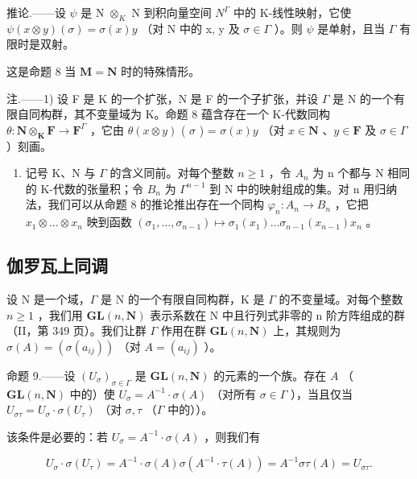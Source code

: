 推论.——设 \(\psi\) 是 N \(\otimes_{K}\) N 到积向量空间 \(N^{\Gamma}\) 中的 K-线性映射，它使 \(\psi(x \otimes y) (\sigma) = \sigma(x)y\) （对 N 中的 x, y 及 \(\sigma \in \Gamma\) ）。则 \(\psi\) 是单射，且当 \(\Gamma\) 有限时是双射。

这是命题 8 当 \(\mathbf{M} = \mathbf{N}\) 时的特殊情形。

注.——1) 设 F 是 K 的一个扩张，N 是 F 的一个子扩张，并设 \(\Gamma\) 是 N 的一个有限自同构群，其不变量域为 K。命题 8 蕴含存在一个 K-代数同构 \(\theta: \mathbf{N} \otimes_{\mathbf{K}} \mathbf{F} \to \mathbf{F}^{\Gamma}\) ，它由 \(\theta(x \otimes y)\) ( \(\sigma\) ) = \(\sigma(x)y\) （对 \(x \in \mathbf{N}\) 、\(y \in \mathbf{F}\) 及 \(\sigma \in \Gamma\) ）刻画。

\begin{enumerate}
\def\labelenumi{\arabic{enumi})}
\setcounter{enumi}{1}
\tightlist
\item
  记号 K、N 与 \(\Gamma\) 的含义同前。对每个整数 \(n \geqslant 1\) ，令 \(A_{n}\) 为 n 个都与 N 相同的 K-代数的张量积；令 \(B_{n}\) 为 \(\Gamma^{n-1}\) 到 N 中的映射组成的集。对 n 用归纳法，我们可以从命题 8 的推论推出存在一个同构 \(\varphi_{n}: A_{n} \to B_{n}\) ，它把 \(x_{1} \otimes \ldots \otimes x_{n}\) 映到函数 \((\sigma_{1}, \ldots, \sigma_{n-1}) \mapsto \sigma_{1}(x_{1}) \ldots \sigma_{n-1}(x_{n-1}) x_{n}\) 。
\end{enumerate}

\subsection{伽罗瓦上同调}

设 N 是一个域，\(\Gamma\) 是 N 的一个有限自同构群，K 是 \(\Gamma\) 的不变量域。对每个整数 \(n \geqslant 1\) ，我们用 \(\mathbf{GL}(n, \mathbf{N})\) 表示系数在 N 中且行列式非零的 n 阶方阵组成的群（II，第 349 页）。我们让群 \(\Gamma\) 作用在群 \(\mathbf{GL}(n, \mathbf{N})\) 上，其规则为 \(\sigma(A) = (\sigma(a_{ij}))\) （对 \(A = (a_{ij})\) ）。

命题 9.——设 \((U_{\sigma})_{\sigma \in \Gamma}\) 是 \(\mathbf{GL}(n, \mathbf{N})\) 的元素的一个族。存在 \(A\) （\(\mathbf{GL}(n, \mathbf{N})\) 中的）使 \(U_{\sigma} = A^{-1} \cdot \sigma(A)\) （对所有 \(\sigma \in \Gamma\) ），当且仅当 \(U_{\sigma\tau} = U_{\sigma} \cdot \sigma(U_{\tau})\) （对 \(\sigma, \tau\) （\(\Gamma\) 中的））。

该条件是必要的：若 \(U_{\sigma} = A^{-1} \cdot \sigma(A)\) ，则我们有

\[
U _ {\sigma} \cdot \sigma (U _ {\tau}) = A ^ {- 1} \cdot \sigma (A) \sigma (A ^ {- 1} \cdot \tau (A)) = A ^ {- 1} \sigma \tau (A) = U _ {\sigma \tau}.
\]


